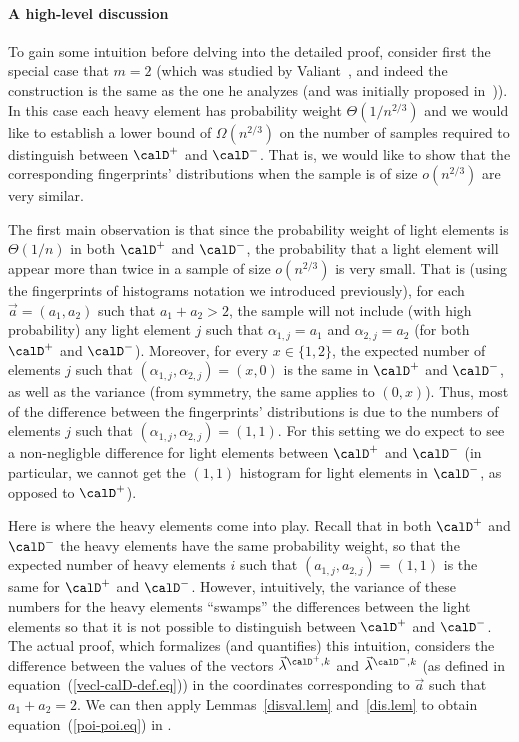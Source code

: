 %

\paragraph{A high-level discussion}
To gain some intuition before delving into the detailed proof,
consider first the special case that $m=2$
(which was studied by Valiant~\cite{val}, and indeed the construction is
the same as the one he analyzes (and was initially proposed
in~\cite{BFRSW})).
%
%
In this case
each heavy element has probability weight $\Theta(1/n^{2/3})$ and we would like to
establish a lower bound of $\Omega(n^{2/3})$ on the number of samples required
to distinguish between $\calD^+$ and $\calD^-$. That is, we would like to show that
the corresponding fingerprints' distributions when the sample is of size
$o(n^{2/3})$ are very similar.

The first main observation is that since the probability
weight of light elements is $\Theta(1/n)$ in both $\calD^+$ and $\calD^-$,
the probability that a light element will appear more than twice  in a sample of
size $o(n^{2/3})$ is very small. That is (using the fingerprints of histograms
notation we introduced previously),
 for each $\vec{a} = (a_1,a_2)$ such that $a_1+a_2 > 2$, the sample
will not include (with high probability) any light element
$j$ such that $\alpha_{1,j} = a_1$ and $\alpha_{2,j} = a_2$
(for both $\calD^+$ and $\calD^-$).
Moreover, for every $x\in \{1,2\}$, the expected number of elements $j$ such that $(\alpha_{1,j},\alpha_{2,j}) = (x,0)$ is the same in $\calD^+$ and $\calD^-$, as well as the variance (from symmetry, the same applies to $(0,x)$).
Thus, most of the difference between the
fingerprints' distributions is due to the numbers of elements $j$
such that $(\alpha_{1,j},\alpha_{2,j}) = (1,1)$.
For this setting we do expect to see a non-negligble difference
for light elements between $\calD^+$ and $\calD^-$ (in particular, we cannot
get the $(1,1)$ histogram for light elements in $\calD^-$, as opposed to
$\calD^+$).
%

Here is where the heavy elements come into play. Recall that in both $\calD^+$ and $\calD^-$
the heavy elements have the same probability weight, so that the expected
number of heavy elements $i$ such that $(a_{1,j},a_{2,j}) = (1,1)$ is the same for $\calD^+$ and $\calD^-$. However,
intuitively, the variance of  these numbers for the heavy elements
``swamps'' the differences between the light elements so that it is not possible
to distinguish between  $\calD^+$ and $\calD^-$. The actual proof, which formalizes
(and quantifies)
this intuition, considers the difference between the values of the vectors $\vec{\lambda}^{\calD^+,k}$ and
$\vec{\lambda}^{\calD^-,k}$ (as defined in
equation~(\ref{vecl-calD-def.eq}))
%
in the coordinates corresponding to
$\vec{a}$ such that $a_1 + a_2 = 2$.
We can then apply Lemmas~\ref{disval.lem} and~\ref{dis.lem} to
obtain equation~(\ref{poi-poi.eq}) in .

